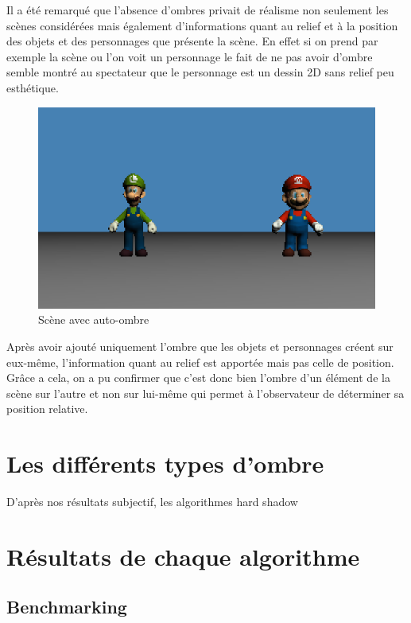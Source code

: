 \documentclass[a4paper,12pt]{report}
\begin{document}
Il a été remarqué que l'absence d'ombres privait de réalisme non seulement les scènes considérées mais également d'informations quant au relief et à la position des objets et des personnages que présente la scène. En effet si on prend par exemple la scène ou l'on voit un personnage le fait de ne pas avoir d'ombre semble montré au spectateur que le personnage est un dessin 2D sans relief peu esthétique.

\begin{figure}[H]
\includegraphics[scale=0.5]{images/autoombre.png}
\centering
\caption{Scène avec auto-ombre}
\end{figure}

Après avoir ajouté uniquement l'ombre que les objets et personnages créent sur eux-même, l'information quant au relief est apportée mais pas celle de position. Gr\^ace a cela, on a pu confirmer que c'est donc bien l'ombre d'un élément de la scène sur l'autre et non sur lui-même qui permet à l'observateur de déterminer sa position relative.

\section{Les différents types d'ombre}

D'après nos résultats subjectif, les algorithmes hard shadow

\section{Résultats de chaque algorithme}

\subsection{Benchmarking}
\end{document}
